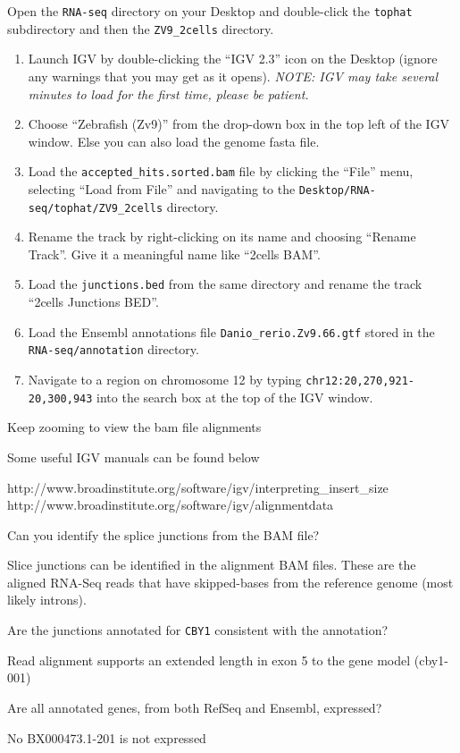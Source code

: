 \begin{steps}
Open the \texttt{RNA-seq} directory on your Desktop and double-click the
\texttt{tophat} subdirectory and then the \texttt{ZV9\_2cells} directory.

\begin{enumerate}
  \item Launch IGV by double-clicking the ``IGV 2.3'' icon on the Desktop
  (ignore any warnings that you may get as it opens). \emph{NOTE: IGV may take
  several minutes to load for the first time, please be patient.}
  \item Choose ``Zebrafish (Zv9)'' from the drop-down box in the top left of the
  IGV window. Else you can also load the genome fasta file.
  \item Load the \texttt{accepted\_hits.sorted.bam} file by clicking the
  ``File'' menu, selecting ``Load from File'' and navigating to the
  \texttt{Desktop/RNA-seq/tophat/ZV9\_2cells} directory.
  \item Rename the track by right-clicking on its name and choosing ``Rename
  Track''. Give it a meaningful name like ``2cells BAM''.
  \item Load the \texttt{junctions.bed} from the same directory and rename the
  track ``2cells Junctions BED''.
  \item Load the Ensembl annotations file \texttt{Danio\_rerio.Zv9.66.gtf}
  stored in the \texttt{RNA-seq/annotation} directory.
  \item Navigate to a region on chromosome 12 by typing
  \texttt{chr12:20,270,921-20,300,943} into the search box at the top of the IGV
  window.
\end{enumerate}

\end{steps}

\begin{information}
Keep zooming to view the bam file alignments

Some useful IGV manuals can be found below

http://www.broadinstitute.org/software/igv/interpreting_insert_size
http://www.broadinstitute.org/software/igv/alignmentdata
\end{information}


\begin{questions}
Can you identify the splice junctions from the BAM file?
\begin{answer}
Slice junctions can be identified in the alignment BAM files.
These are the aligned RNA-Seq reads that have skipped-bases from the reference genome (most likely introns).
\end{answer}

Are the junctions annotated for \texttt{CBY1} consistent with the annotation?
\begin{answer}
Read alignment supports an extended length in exon 5 to the gene model (cby1-001) 
\end{answer}

Are all annotated genes, from both RefSeq and Ensembl, expressed?
\begin{answer}
No BX000473.1-201 is not expressed
\end{answer}

\end{questions}

